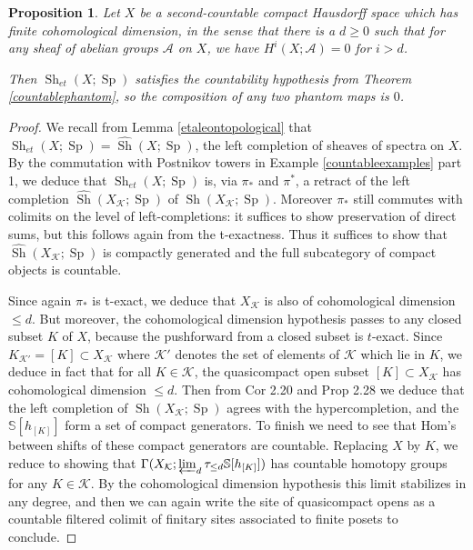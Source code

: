 \documentclass[12pt]{article}
\newtheorem{proposition}[theorem]{Proposition}
\newcommand{\on}{\operatorname}
\begin{document}
\begin{proposition}\label{chauscohdim}
Let $X$ be a second-countable compact Hausdorff space which has finite cohomological dimension, in the sense that there is a $d\geq 0$ such that for any sheaf of abelian groups $\mathcal{A}$ on $X$, we have $H^i(X;\mathcal{A})=0$ for $i>d$.

Then $\on{Sh}_{et}(X;\on{Sp})$ satisfies the countability hypothesis from Theorem \ref{countablephantom}, so the composition of any two phantom maps is $0$.
\end{proposition}
\begin{proof}
We recall from Lemma \ref{etaleontopological} that $\on{Sh}_{et}(X;\on{Sp})=\widehat{\on{Sh}}(X;\on{Sp})$, the left completion of sheaves of spectra on $X$.  By the commutation with Postnikov towers in Example \ref{countableexamples} part 1, we deduce that $\on{Sh}_{et}(X;\on{Sp})$ is, via $\pi_\ast$ and $\pi^\ast$, a retract of the left completion $\widehat{\on{Sh}}(X_\mathcal{K};\on{Sp})$ of $\on{Sh}(X_{\mathcal{K}};\on{Sp})$.  Moreover $\pi_\ast$ still commutes with colimits on the level of left-completions: it suffices to show preservation of direct sums, but this follows again from the t-exactness.  Thus it suffices to show that $\widehat{\on{Sh}}(X_{\mathcal{K}};\on{Sp})$ is compactly generated and the full subcategory of compact objects is countable.

Since again $\pi_\ast$ is t-exact, we deduce that $X_\mathcal{K}$ is also of cohomological dimension $\leq d$.  But moreover, the cohomological dimension hypothesis passes to any closed subset $K$ of $X$, because the pushforward from a closed subset is $t$-exact.   Since $K_{\mathcal{K}'} = [K]\subset X_\mathcal{K}$ where $\mathcal{K}'$ denotes the set of elements of $\mathcal{K}$ which lie in $K$, we deduce in fact that for all $K\in\mathcal{K}$, the quasicompact open subset $[K]\subset X_{\mathcal{K}}$ has cohomological dimension $\leq d$.  Then from \cite{ClausenHyper} Cor 2.20 and Prop 2.28 we deduce that the left completion of $\on{Sh}(X_\mathcal{K};\on{Sp})$ agrees with the hypercompletion, and the $\mathbb{S}[h_{[K]}]$ form a set of compact generators.  To finish we need to see that Hom's between shifts of these compact generators are countable.  Replacing $X$ by $K$, we reduce to showing that $\Gamma(X_\mathcal{K};\varprojlim_d \tau_{\leq d}\mathbb{S}[h_{[K]}])$ has countable homotopy groups for any $K\in\mathcal{K}$.  By the cohomological dimension hypothesis this limit stabilizes in any degree, and then we can again write the site of quasicompact opens as a countable filtered colimit of finitary sites associated to finite posets to conclude.
\end{proof}
\end{document}

